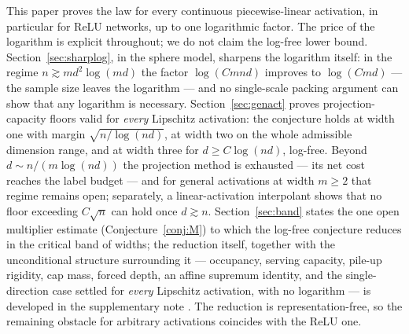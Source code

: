 \documentclass[11pt,reqno]{amsart}
\theoremstyle{plain}
\theoremstyle{definition}
\theoremstyle{remark}
\begin{document}
This paper proves the law for every continuous piecewise-linear activation, in particular for ReLU networks, up to one logarithmic factor. The price of the logarithm is explicit throughout; we do not claim the log-free lower bound. Section~\ref{sec:sharplog}, in the sphere model, sharpens the logarithm itself: in the regime $n\gtrsim md^2\log(md)$ the factor $\log(Cmnd)$ improves to $\log(Cmd)$ --- the sample size leaves the logarithm --- and no single-scale packing argument can show that any logarithm is necessary. Section~\ref{sec:genact} proves projection-capacity floors valid for \emph{every} Lipschitz activation: the conjecture holds at width one with margin $\sqrt{n/\log(nd)}$, at width two on the whole admissible dimension range, and at width three for $d\ge C\log(nd)$, log-free. Beyond $d\sim n/(m\log(nd))$ the projection method is exhausted --- its net cost reaches the label budget --- and for general activations at width $m\ge2$ that regime remains open; separately, a linear-activation interpolant shows that no floor exceeding $C\sqrt n$ can hold once $d\gtrsim n$. Section~\ref{sec:band} states the one open multiplier estimate (Conjecture~\ref{conj:M}) to which the log-free conjecture reduces in the critical band of widths; the reduction itself, together with the unconditional structure surrounding it --- occupancy, serving capacity, pile-up rigidity, cap mass, forced depth, an affine supremum identity, and the single-direction case settled for \emph{every} Lipschitz activation, with no logarithm --- is developed in the supplementary note \cite{supp}. The reduction is representation-free, so the remaining obstacle for arbitrary activations coincides with the ReLU one.
\end{document}
